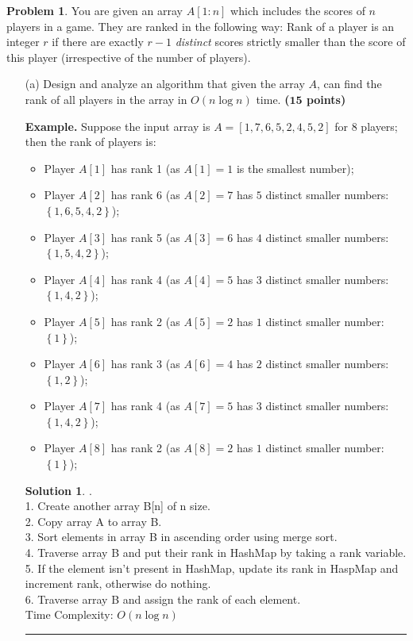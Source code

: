 \documentclass{article}
\theoremstyle{definition}
\newtheorem{problem}{Problem}
\def\fline{\rule{0.75\linewidth}{0.5pt}}
\newcommand{\finishline}{\begin{center}\fline\end{center}}
\newtheorem*{solution*}{Solution}
\newenvironment{solution}{\begin{solution*}}{{\finishline} \end{solution*}}
\newcommand{\grade}[1]{\hfill{\textbf{($\mathbf{#1}$ points)}}}
\newcommand{\set}[1]{\ensuremath{\left\{ #1 \right\}}}
\begin{document}
\begin{problem}
    You are given an array $A[1:n]$ which includes the scores of $n$ players in a game. They are ranked in the following way: 
    Rank of a player is an integer $r$ if there are exactly $r-1$ \emph{distinct} scores strictly smaller than the score of this player (irrespective of the number of players).
  
  \begin{enumerate}
  	\item[(a)] Design and analyze an algorithm that given the array $A$, can find the rank of all players in the array in $O(n\log{n})$ time. \grade{15}
    
    	\medskip
    
    \textbf{Example.} Suppose the input array is $A=[1,7,6,5,2,4,5,2]$ for 8 players; then the rank of  players is: 
    \begin{itemize}
        \item Player $A[1]$ has rank 1 (as $A[1]=1$ is the smallest number); 
        \item Player $A[2]$ has rank 6 (as $A[2]=7$ has $5$ distinct smaller numbers: $\set{1,6,5,4,2}$);
        \item Player $A[3]$ has rank 5 (as $A[3]=6$ has $4$ distinct smaller numbers: $\set{1,5,4,2}$);
        \item Player $A[4]$ has rank 4 (as $A[4]=5$ has $3$ distinct smaller numbers: $\set{1,4,2}$);
        \item Player $A[5]$ has rank 2 (as $A[5]=2$ has $1$ distinct smaller number: $\set{1}$);
        \item Player $A[6]$ has rank 3 (as $A[6]=4$ has $2$ distinct smaller numbers: $\set{1,2}$);
        \item Player $A[7]$ has rank 4 (as $A[7]=5$ has $3$ distinct smaller numbers: $\set{1,4,2}$);
        \item Player $A[8]$ has rank 2 (as $A[8]=2$ has $1$ distinct smaller number: $\set{1}$);
    \end{itemize}
    
    
    	 \begin{solution} .\\
	 1. Create another array B[n] of n size. \\
	 2. Copy array A to array B. \\
	 3. Sort elements in array B in ascending order using merge sort. \\
	 4. Traverse array B and put their rank in HashMap by taking a rank variable. \\
	 5. If the element isn't present in HashMap, update its rank in HaspMap and increment rank, otherwise do nothing. \\
	 6. Traverse array B and assign the rank of each element. \\
	 Time Complexity: $O(n\log{n})$ 
	

\end{solution}
\end{enumerate}
\end{problem}
\end{document}
